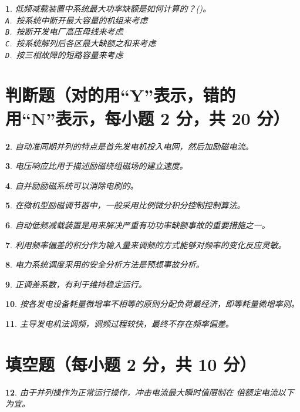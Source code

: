 \documentclass[twocolumn]{ctexart}
\theoremstyle{plain}
\newtheorem{ti}{}[section]
\def\kuo{\mbox{(\hspace{1pc})}}
\def\hua#1{\CJKunderline*[hidden = true]{占#1位}}
\newcommand{\onech}[4]{\\\texttt{A}.~#1 \\ \texttt{B}.~#2 \\ \texttt{C}.~#3 \\ \texttt{D}.~#4}  %
\begin{document}
	\begin{ti}
		低频减载装置中系统最大功率缺额是如何计算的？\kuo。
		\onech{按系统中断开最大容量的机组来考虑}{按断开发电厂高压母线来考虑}{按系统解列后各区最大缺额之和来考虑}{按三相故障的短路容量来考虑}
	\end{ti}

	\section{判断题（对的用“Y”表示，错的用“N”表示，每小题 2 分，共 20 分）}
	\begin{ti}
		自动准同期并列的特点是首先发电机投入电网，然后加励磁电流。
	\end{ti}

	\begin{ti}
		电压响应比用于描述励磁绕组磁场的建立速度。
	\end{ti}

	\begin{ti}
		自并励励磁系统可以消除电刷的。
	\end{ti}

	\begin{ti}
		在微机型励磁调节器中，一般采用比例微分积分控制控制算法。
	\end{ti}

	\begin{ti}
		自动低频减载装置是用来解决严重有功功率缺额事故的重要措施之一。
	\end{ti}

	\begin{ti}
		利用频率偏差的积分作为输入量来调频的方式能够对频率的变化反应灵敏。
	\end{ti}

	\begin{ti}
		电力系统调度采用的安全分析方法是预想事故分析。
	\end{ti}

	\begin{ti}
		正调差系数，有利于维持稳定运行。
	\end{ti}

	\begin{ti}
		按各发电设备耗量微增率不相等的原则分配负荷最经济，即等耗量微增率则。
	\end{ti}

	\begin{ti}
		主导发电机法调频，调频过程较快，最终不存在频率偏差。
	\end{ti}

	\section{填空题（每小题 2 分，共 10 分）}
	\begin{ti}
		由于并列操作为正常运行操作，冲击电流最大瞬时值限制在 \hua{1-2} 倍额定电流以下为宜。
	\end{ti}
\end{document}
